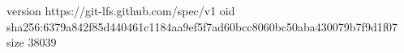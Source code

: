 version https://git-lfs.github.com/spec/v1
oid sha256:6379a842f85d440461c1184aa9ef5f7ad60bcc8060bc50aba430079b7f9d1f07
size 38039
